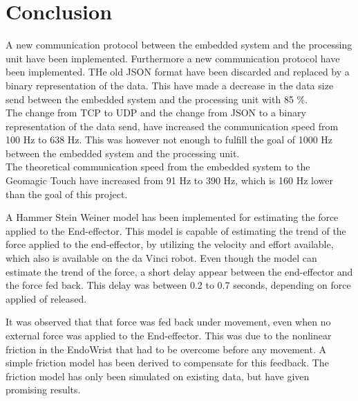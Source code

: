\chapter{Conclusion}\label{cha:conclusion}


A new communication protocol between the embedded system and the processing unit have been implemented. Furthermore a new communication protocol have been implemented. THe old JSON format have been discarded and replaced by a binary representation of the data. This have made a decrease in the data size send between the embedded system and the processing unit with 85 \%.\\ 
The change from TCP to UDP and the change from JSON to a binary representation of the data send, have increased the communication speed from 100 Hz to 638 Hz. This was however not enough to fulfill the goal of 1000 Hz between the embedded system and the processing unit.\\
The theoretical communication speed from the embedded system to the Geomagic Touch have increased from 91 Hz to 390 Hz, which is 160 Hz lower than the goal of this project. 



A Hammer Stein Weiner model has been implemented for estimating the force applied to the End-effector. This model is capable of estimating the trend of the force applied to the end-effector, by utilizing the velocity and effort available, which also is available on the da Vinci robot. Even though the model can estimate the trend of the force, a short delay appear between the end-effector and the force fed back. This delay was between 0.2 to 0.7 seconds, depending on force applied of released. 



It was observed that that force was fed back under movement, even when no external force was applied to the End-effector. This was due to the nonlinear friction in the EndoWrist that had to be overcome before any movement. A simple friction model has been derived to compensate for this feedback. The friction model has only been simulated on existing data, but have given promising results. 


